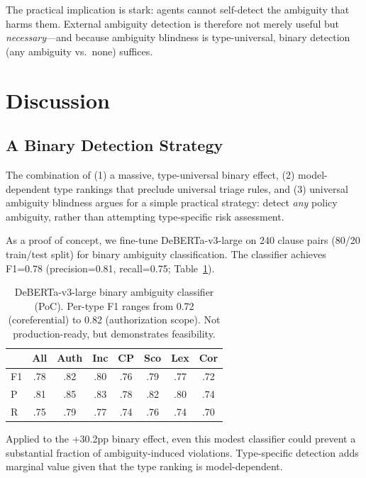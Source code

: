 \documentclass[11pt]{article}
\begin{document}
The practical implication is stark: agents cannot self-detect the ambiguity that harms them. External ambiguity detection is therefore not merely useful but \emph{necessary}---and because ambiguity blindness is type-universal, binary detection (any ambiguity vs.\ none) suffices.

\section{Discussion}
\label{sec:discussion}

\subsection{A Binary Detection Strategy}

The combination of (1) a massive, type-universal binary effect, (2) model-dependent type rankings that preclude universal triage rules, and (3) universal ambiguity blindness argues for a simple practical strategy: detect \emph{any} policy ambiguity, rather than attempting type-specific risk assessment.

As a proof of concept, we fine-tune DeBERTa-v3-large on 240 clause pairs (80/20 train/test split) for binary ambiguity classification. The classifier achieves F1=0.78 (precision=0.81, recall=0.75; Table~\ref{tab:classifier}).

\begin{table}[t]
\centering
\small
\begin{tabular}{lccccccc}
\toprule
& \textbf{All} & \textbf{Auth} & \textbf{Inc} & \textbf{CP} & \textbf{Sco} & \textbf{Lex} & \textbf{Cor} \\
\midrule
F1 & .78 & .82 & .80 & .76 & .79 & .77 & .72 \\
P & .81 & .85 & .83 & .78 & .82 & .80 & .74 \\
R & .75 & .79 & .77 & .74 & .76 & .74 & .70 \\
\bottomrule
\end{tabular}
\caption{DeBERTa-v3-large binary ambiguity classifier (PoC). Per-type F1 ranges from 0.72 (coreferential) to 0.82 (authorization scope). Not production-ready, but demonstrates feasibility.}
\label{tab:classifier}
\end{table}

Applied to the +30.2pp binary effect, even this modest classifier could prevent a substantial fraction of ambiguity-induced violations. Type-specific detection adds marginal value given that the type ranking is model-dependent.
\end{document}
